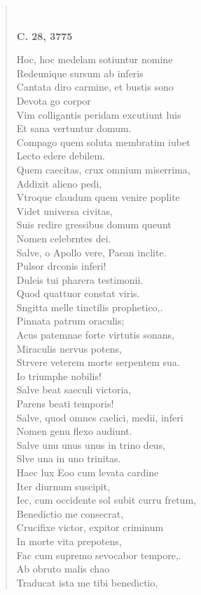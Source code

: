 \documentclass[11pt, a4paper]{report}
\begin{document}
\begin{verse}
        ﻿\pagebreak 
    \begin{center} \textbf{C. 28, 3775} \end{center} \marginpar{[351]} Hoc, hoc medelam sotiuntur nomine \\ Redeunique sursum ab inferis \\ Cantata diro carmine, et bustis sono \\ Devota go corpor \\ Vim colligantis peridam excutiunt luis \\ Et sana vertuntur domum. \\ Compago quem soluta membratim iubet \\ Lecto edere debilem. \\ Quem caecitas, crux omnium miserrima, \\ Addixit alieno pedi, \\ Vtroque claudum quem venire poplite \\ Videt universa civitas, \\ Suis redire gressibus domum queunt \\ Nomen celebrntes dei. \\ Salve, o Apollo vere, Paean inclite. \\ Pulsor drconis inferi! \\ Duleis tui pharera testimonii. \\ Quod quattuor constat viris. \\ Sngitta melle tinctilis prophetico,. \\ Pinnata patrum oraculis; \\ Acus patemnae forte virtutis sonans, \\ Miraculis nervus potens, \\ Strvere veterem morte serpentem sua. \\ Io triumphe nobilis! \\ Salve beat saeculi victoria, \\ Parens beati temporis! \\ Salve, quod omnes caelici, medii, inferi \\ Nomen genu flexo audiunt. \\ Salve unu unus unus in trino deus, \\ Slve una in uno trinitas. \\ Haec lux Eoo cum levata cardine \\ Iter diurnum suscipit, \\ Iec, cum occidente sol subit curru fretum, \\ Benedictio me consecrat, \\ Crucifixe victor, expitor criminum \\ In morte vita prepotens, \\ Fac cum supremo sevocabor tempore,. \\ Ab obruto malis chao \\ Traducat ista me tibi benedictio, \\ 

\end{verse}
\end{document}
